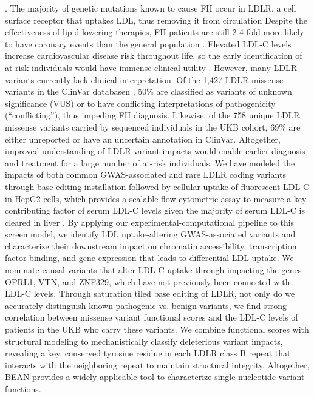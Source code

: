 \documentclass[a4paper, titlepage, openright]{book}
\begin{document}
\citep{bouhairie2015familial}. The majority of genetic mutations known to cause FH occur in LDLR, a cell surface receptor that uptakes LDL, thus removing it from circulation \citep{brown1984ldl} Despite the effectiveness of lipid lowering therapies, FH patients are still 2-4-fold more likely to have coronary events than the general population \citep{mundal2018impact}. Elevated LDL-C levels increase cardiovascular disease risk throughout life, so the early identification of at-risk individuals would have immense clinical utility \citep{bouhairie2015familial}. However, many LDLR variants currently lack clinical interpretation. Of the 1,427 LDLR missense variants in the ClinVar databasen \citep{landrum2020clinvar}, 50\% are classified as variants of unknown significance (VUS) or to have conflicting interpretations of pathogenicity (“conflicting”), thus impeding FH diagnosis. Likewise, of the 758 unique LDLR missense variants carried by sequenced individuals in the UKB cohort, 69\% are either unreported or have an uncertain annotation in ClinVar. Altogether, improved understanding of LDLR variant impacts would enable earlier diagnosis and treatment for a large number of at-risk individuals. We have modeled the impacts of both common GWAS-associated and rare LDLR coding variants through base editing installation followed by cellular uptake of fluorescent LDL-C in HepG2 cells, which provides a scalable flow cytometric assay to measure a key contributing factor of serum LDL-C levels \citep{hamilton2023systematic} given the majority of serum LDL-C is cleared in liver \citep{spady1992hepatic}.  By applying our experimental-computational pipeline to this screen model, we identify LDL uptake-altering GWAS-associated variants and characterize their downstream impact on chromatin accessibility, transcription factor binding, and gene expression that leads to differential LDL uptake. We nominate causal variants that alter LDL-C uptake through impacting the genes  OPRL1, VTN, and ZNF329, which have not previously been connected with LDL-C levels. Through saturation tiled base editing of LDLR, not only do we accurately distinguish known pathogenic vs. benign variants, we find strong correlation between missense variant functional scores and the LDL-C levels of patients in the UKB who carry these variants. We combine functional scores with structural modeling to mechanistically classify deleterious variant impacts, revealing a key, conserved tyrosine residue in each LDLR class B repeat that interacts with the neighboring repeat to maintain structural integrity. Altogether, BEAN provides a widely applicable tool to characterize single-nucleotide variant functions. 
\end{document}

